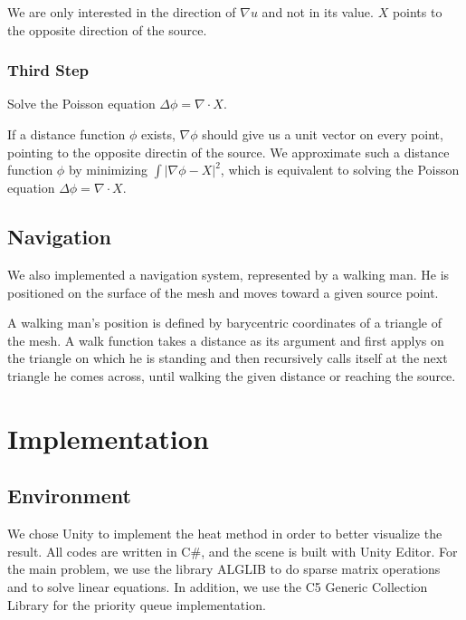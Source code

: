 \documentclass[a4paper,12pt,twoside]{article}
\begin{document}
We are only interested in the direction of $\nabla u$ and not in its value. $X$ points to the opposite direction of the source. 

\subsubsection{Third Step}

Solve the Poisson equation $\Delta \phi = \nabla \cdot X$.

If a distance function $\phi$ exists, $\nabla \phi$ should give us a unit vector on every point, pointing to the opposite directin of the source. We approximate such a distance function $\phi$ by minimizing $\int \left | \nabla \phi - X \right |^{2}$, which is equivalent to solving the Poisson equation $\Delta \phi = \nabla \cdot X$.

\subsection{Navigation}

We also implemented a navigation system, represented by a walking man. He is positioned on the surface of the mesh and moves toward a given source point. 

A walking man's position is defined by barycentric coordinates of a triangle of the mesh. A walk function takes a distance as its argument and first applys on the triangle on which he is standing and then recursively calls itself at the next triangle he comes across, until walking the given distance or reaching the source.

\section{Implementation}

\subsection{Environment}

We chose Unity to implement the heat method in order to better visualize the result. All codes are written in C\#, and the scene is built with Unity Editor. For the main problem, we use the library ALGLIB to do sparse matrix operations and to solve linear equations. In addition, we use the C5 Generic Collection Library for the priority queue implementation.

\end{document}
